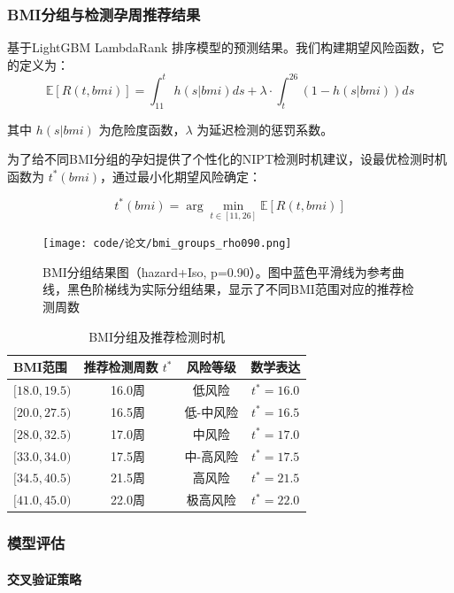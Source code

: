 \documentclass[12pt,a4paper]{ctexart}
\numberwithin{equation}{section}
\theoremstyle{mcm}
\begin{document}
\subsubsection{BMI分组与检测孕周推荐结果}
基于LightGBM LambdaRank 排序模型的预测结果。我们构建期望风险函数，它的定义为：
$$\mathbb{E}[R(t, bmi)] = \int_{11}^t h(s|bmi) ds + \lambda \cdot \int_t^{26} (1-h(s|bmi)) ds$$

其中 $h(s|bmi)$ 为危险度函数，$\lambda$ 为延迟检测的惩罚系数。

为了给不同BMI分组的孕妇提供了个性化的NIPT检测时机建议，设最优检测时机函数为 $t^*(bmi)$，通过最小化期望风险确定：

$$t^*(bmi) = \arg\min_{t \in [11, 26]} \mathbb{E}[R(t, bmi)]$$

\begin{figure}[H]
\centering
\texttt{[image: code/论文/bmi\_groups\_rho090.png]}
\caption{BMI分组结果图（hazard+Iso, p=0.90）。图中蓝色平滑线为参考曲线，黑色阶梯线为实际分组结果，显示了不同BMI范围对应的推荐检测周数}
\label{fig:bmi_curve}
\end{figure}

\begin{table}[H]
\centering
\caption{BMI分组及推荐检测时机}
\label{tab:bmi_groups}
\begin{tabular}{@{}lccc@{}}
\toprule
BMI范围 & 推荐检测周数 $t^*$ & 风险等级 & 数学表达 \\
\midrule
$[18.0, 19.5)$ & 16.0周 & 低风险 & $t^* = 16.0$ \\
$[20.0, 27.5)$ & 16.5周 & 低-中风险 & $t^* = 16.5$ \\
$[28.0, 32.5)$ & 17.0周 & 中风险 & $t^* = 17.0$ \\
$[33.0, 34.0)$ & 17.5周 & 中-高风险 & $t^* = 17.5$ \\
$[34.5, 40.5)$ & 21.5周 & 高风险 & $t^* = 21.5$ \\
$[41.0, 45.0)$ & 22.0周 & 极高风险 & $t^* = 22.0$ \\
\bottomrule
\end{tabular}
\end{table}

\subsubsection{模型评估}


\paragraph{交叉验证策略}
\end{document}
